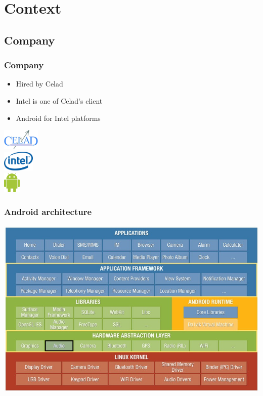 %
%

\section{Context}

\subsection{Company}
\begin{frame}
    \frametitle{Company}
    \begin{minipage}{0.49\textwidth}
        \begin{itemize}
            \item Hired by Celad
            \item Intel is one of Celad's client
            \item Android for Intel platforms
        \end{itemize}
    \end{minipage}
    \begin{minipage}{0.49\textwidth}
        \flushright
        \includegraphics[height=1cm]{../../report/src/img/logocelad.jpg} \\[0.5cm]
        \includegraphics[height=1cm]{../../report/src/img/logointel.jpg} \\[0.5cm]
        \includegraphics[height=1cm]{./img/androidLogo.png}
    \end{minipage}
\end{frame}

\begin{frame}
    \frametitle{Android architecture}
    \includegraphics[width=\textwidth]{../../report/src/img/android-archi-audio-hal.jpeg}
\end{frame}

